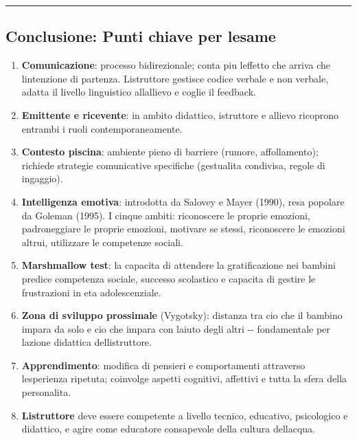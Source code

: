 \documentclass[a4paper,11pt]{article}
\begin{document}
\begin{center}\rule{0.5\linewidth}{0.5pt}\end{center}

\subsection{Conclusione: Punti chiave per
      l\textquotesingle esame}\label{conclusione-punti-chiave-per-lesame}

\begin{enumerate}
      \item
            \textbf{Comunicazione}: processo bidirezionale; conta piu
            l\textquotesingle effetto che arriva che l\textquotesingle intenzione
            di partenza. L\textquotesingle istruttore gestisce codice verbale e
            non verbale, adatta il livello linguistico all\textquotesingle allievo
            e coglie il feedback.
      \item
            \textbf{Emittente e ricevente}: in ambito didattico, istruttore e
            allievo ricoprono entrambi i ruoli contemporaneamente.
      \item
            \textbf{Contesto piscina}: ambiente pieno di barriere (rumore,
            affollamento); richiede strategie comunicative specifiche (gestualita
            condivisa, regole di ingaggio).
      \item
            \textbf{Intelligenza emotiva}: introdotta da Salovey e Mayer (1990),
            resa popolare da Goleman (1995). I cinque ambiti: riconoscere le
            proprie emozioni, padroneggiare le proprie emozioni, motivare se
            stessi, riconoscere le emozioni altrui, utilizzare le competenze
            sociali.
      \item
            \textbf{Marshmallow test}: la capacita di attendere la gratificazione
            nei bambini predice competenza sociale, successo scolastico e capacita
            di gestire le frustrazioni in eta adolescenziale.
      \item
            \textbf{Zona di sviluppo prossimale} (Vygotsky): distanza tra cio che
            il bambino impara da solo e cio che impara con l\textquotesingle aiuto
            degli altri -\/- fondamentale per l\textquotesingle azione didattica
            dell\textquotesingle istruttore.
      \item
            \textbf{Apprendimento}: modifica di pensieri e comportamenti
            attraverso l\textquotesingle esperienza ripetuta; coinvolge aspetti
            cognitivi, affettivi e tutta la sfera della personalita.
      \item
            \textbf{L\textquotesingle istruttore} deve essere competente a livello
            tecnico, educativo, psicologico e didattico, e agire come educatore
            consapevole della cultura dell\textquotesingle acqua.
\end{enumerate}
\end{document}
